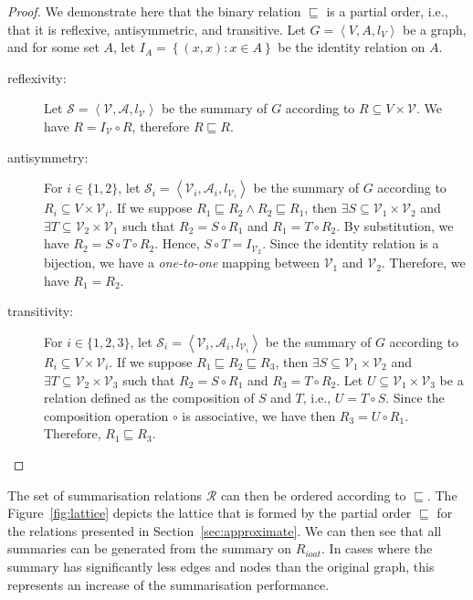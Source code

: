 \begin{proof}
We demonstrate here that the binary relation $\sqsubseteq$ is a partial order, i.e., that it is reflexive, antisymmetric, and transitive.
Let $G=\left\langle V, A, l_V \right\rangle$ be a graph, and for some set $A$, let $I_A = \left\lbrace (x, x) : x \in A \right\rbrace$ be the identity relation on $A$.
\begin{description}
\item[reflexivity:] Let $\mathcal{S} = \left\langle \mathcal{V}, \mathcal{A}, l_{\mathcal{V}} \right\rangle$ be the summary of $G$ according to $R \subseteq V \times \mathcal{V}$. We have $R = I_\mathcal{V} \circ R$, therefore $R \sqsubseteq R$.
\item[antisymmetry:] For $i \in \{1, 2\}$, let $\mathcal{S}_i = \left\langle \mathcal{V}_i, \mathcal{A}_i, l_{\mathcal{V}_i} \right\rangle$ be the summary of $G$ according to $R_i \subseteq V \times \mathcal{V}_i$. If we suppose $R_1 \sqsubseteq R_2 \wedge R_2 \sqsubseteq R_1$, then $\exists S \subseteq \mathcal{V}_1 \times \mathcal{V}_2$ and $\exists T \subseteq \mathcal{V}_2 \times \mathcal{V}_1$ such that $R_2 = S \circ R_1$ and $R_1 = T \circ R_2$. By substitution, we have $R_2 = S \circ T \circ R_2$. Hence, $S \circ T = I_{\mathcal{V}_2}$. Since the identity relation is a bijection, we have a \emph{one-to-one} mapping between $\mathcal{V}_1$ and $\mathcal{V}_2$. Therefore, we have $R_1 = R_2$.
\item[transitivity:] For $i \in \{1, 2, 3\}$, let $\mathcal{S}_i = \left\langle \mathcal{V}_i, \mathcal{A}_i, l_{\mathcal{V}_i} \right\rangle$ be the summary of $G$ according to $R_i \subseteq V \times \mathcal{V}_i$. If we suppose $R_1 \sqsubseteq R_2 \sqsubseteq R_3$, then $\exists S \subseteq \mathcal{V}_1 \times \mathcal{V}_2$ and $\exists T \subseteq \mathcal{V}_2 \times \mathcal{V}_3$ such that $R_2 = S \circ R_1$ and $R_3 = T \circ R_2$. Let $U \subseteq \mathcal{V}_1 \times \mathcal{V}_3$ be a relation defined as the composition of $S$ and $T$, i.e., $U = T \circ S$. Since the composition operation $\circ$ is associative, we have then $R_3 = U \circ R_1$. Therefore, $R_1 \sqsubseteq R_3$.
\end{description}
\end{proof}

The set of summarisation relations $\mathcal{R}$ can then be ordered according to $\sqsubseteq$. The Figure~\ref{fig:lattice} depicts the lattice that is formed by the partial order $\sqsubseteq$ for the relations presented in Section~\ref{sec:approximate}. We can then see that all summaries can be generated from the summary on $R_{ioat}$. In cases where the summary has significantly less edges and nodes than the original graph, this represents an increase of the summarisation performance.


